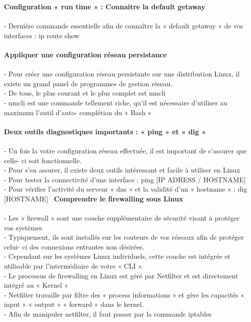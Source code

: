 \documentclass[10pt,a4paper]{article}
\begin{document}
{\large\textbf{Configuration « run time » : Connaitre la default getaway }}\\\\
- Dernière commande essentielle afin de connaître la « default getaway » de vos interfaces : ip route show  \\\\
{\large\textbf{Appliquer une configuration réseau persistance}}\\\\
- Pour créer une configuration réseau persistante sur une distribution Linux, il existe un grand panel de programmes de gestion réseau. \\
- De tous, le plus courant et le plus complet est nmcli  \\
- nmcli est une commande tellement riche, qu’il est nécessaire d’utiliser au maximum l’outil d’auto- complétion du « Bash » \\\\
{\large\textbf{Deux outils diagnostiques importants : « ping »  et « dig » }}\\\\
- Un fois la votre configuration réseau effectuée, il est important de s’assurer que celle- ci soit fonctionnelle. \\
- Pour s’en assurer, il existe deux outils intéressant et facile à utiliser en Linux \\
- Pour tester la connectivité d’une interface : ping [IP ADRESS / HOSTNAME]  \\
- Pour vérifier l’activité du serveur « dns » et la validité d’un « hostname » : dig [HOSTNAME] \
{\large\textbf{Comprendre le firewalling sous Linux  }}\\\\
- Les « firewall » sont une couche supplémentaire de sécurité visant à protéger vos systèmes. \\
- Typiquement, ils sont installés sur les routeurs de vos réseaux afin de protéger celui- ci des connexions entrantes non désirées. \\
- Cependant sur les systèmes Linux individuels, cette couche est intégrée et utilisable par l’intermédiaire de votre « CLI ». \\
- Le processus de firewalling en Linux est géré par Netfilter et est directement intégré au « Kernel » \\
- Netfilter travaille par filtre des « process informations » et gère les capacités « input » « output » « forward » dans le kernel. \\
- Afin de manipuler netfilter, il faut passer par la commande iptables \\
\end{document}
